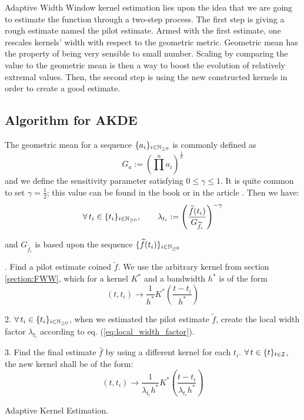 Adaptive Width Window kernel estimation lies upon the idea that we are going to estimate the function through a two-step process. The first step is giving a rough estimate named the pilot estimate. Armed with the first estimate, one rescales kernels' width with respect to the geometric metric. Geometric mean has the property of being very sensible to small number. Scaling by comparing the value to the geometric mean is then a way to boost the evolution of relatively extremal values. 
Then, the second step is using the new constructed kernels in order to create a good estimate.



\subsection{Algorithm for AKDE}
\label{section:algo_awke}
The geometric mean for a sequence $\{  a_i  \}_{ i \in \mathbb{N}_{\geq 0}} $ is commonly defined as $$ G_{a} := \left (  \prod^n a_i \right  )^{\frac 1 n }$$ and we define the sensitivity parameter satisfying $ 0 \leq \gamma \leq 1$. It is quite common to set $\gamma = \frac 1 2$; this value can be found in the book \cite{Silverman} or in the article \cite{abramson}. Then we have:
\begin{equation}
\label{eq:local_width_factor}
\forall t_i \in \sequence{t_i}, \qquad \lambda_{t_i} :=  \left ( \frac{\widetilde{f}(t_i) }{G_{\widetilde{f_i}} } \right ) ^{ - \gamma }  
\end{equation}

and  $ G_{\widetilde{f_i}} $ is based upon the sequence $ \{  \widetilde{f}(t_i)  \}_{ i \in \mathbb{N}_{\geq 0}} $






\begin{algorithm}[H]
\label{algo:adaptive1}
. \quad Find a pilot estimate coined $\widetilde{f}$. We use the arbitrary kernel from section \ref{section:FWW}, which for a kernel $K^*$ and a bandwidth $h^*$ is of the form $$ (t, t_i) \to \frac 1 {h^*} K^* \left ( \frac{t - t_i}{h^*} \right ) $$ 

2. \quad $\forall t_i \in \sequence{t_i}$, when we estimated the pilot estimate $\widetilde{f}$, create the local width factor $\lambda_{t_i}$ according to eq. (\ref{eq:local_width_factor}). 

3. \quad Find the final estimate $\hat{f}$ by using a different kernel for each $t_i$. $\forall t \in \sequencetime $, the new kernel shall be of the form:
$$ (t, t_i) \to \frac 1 {\lambda_{t_i} h^*} K^* \left ( \frac{t - t_i}{\lambda_{t_i} h^*} \right )$$ 
\caption{Adaptive Kernel Estimation.}
\end{algorithm}












